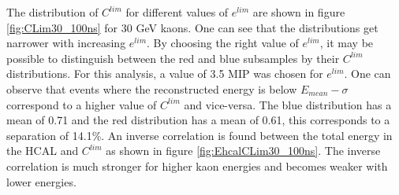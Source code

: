The distribution of $C^{lim}$ for different values of $e^{lim}$ are shown in figure \ref{fig:CLim30_100ns} for 30 GeV kaons. One can see that the distributions get narrower with increasing $e^{lim}$. By choosing the right value of $e^{lim}$, it may be possible to distinguish between the red and blue subsamples by their $C^{lim}$ distributions. For this analysis, a value of 3.5 MIP was chosen for $e^{lim}$. One can observe that events where the reconstructed energy is below $E_{mean} - \sigma$ correspond to a higher value of $C^{lim}$ and vice-versa. The blue distribution has a mean of 0.71 and the red distribution has a mean of 0.61, this corresponds to a separation of 14.1\%. An inverse correlation is found between the total energy in the HCAL and $C^{lim}$ as shown in figure \ref{fig:EhcalCLim30_100ns}. The inverse correlation is much stronger for higher kaon energies and becomes weaker with lower energies.

